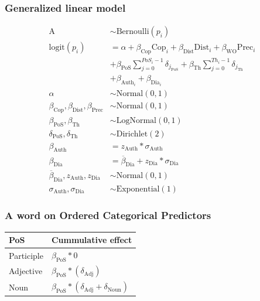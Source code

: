 \documentclass[10pt]{beamer}
\begin{document}
\begin{frame}
	\frametitle{Generalized linear model}
	\small
	\begin{align*}
		\text{A} &\sim \text{Bernoulli}(p_i)\\
		\text{logit}(p_i) &= \alpha + 
		\beta_{\text{Cop}}\text{Cop}_i + 
		\beta_{\text{Dist}}\text{Dist}_i + \beta_{\text{WO}} \text{Prec}_i \\&+
		\beta_{\text{PoS}}\sum^{PoS_{i}-1}_{j=0}{\delta_{j_{\text{PoS}}}} + \beta_{\text{Th}}\sum^{Th_{i}-1}_{j=0}{\delta_{j_{\text{Th}}}} \\&+
			\beta_{\text{Auth}_{i}} + \beta_{\text{Dia}_i}\\
		\alpha &\sim \text{Normal}(0, 1)\\
		\beta_{\text{Cop}}, \beta_{\text{Dist}}, \beta_{\text{Prec}} &\sim \text{Normal}(0, 1)\\
		\beta_{\text{PoS}}, \beta_{\text{Th}} &\sim \text{LogNormal}(0, 1)\\
		\delta_{\text{PoS}}, \delta_{\text{Th}} &\sim \text{Dirichlet}(2)\\
		\beta_{\text{Auth}} &= z_{\text{Auth}}*\sigma_{\text{Auth}}\\
		\beta_{\text{Dia}} &= \overline{\beta}_\text{Dia} + z_{\text{Dia}}*\sigma_{\text{Dia}}\\
		\overline{\beta}_\text{Dia}, z_{\text{Auth}}, z_{\text{Dia}} &\sim \text{Normal}(0,1)\\
		\sigma_{\text{Auth}}, \sigma_{\text{Dia}} &\sim \text{Exponential}(1)
	\end{align*}
\end{frame}

\begin{frame}
	\frametitle{A word on Ordered Categorical Predictors}

	\begin{center}
	\begin{tabular}[t]{ll}
	\toprule
	PoS & Cummulative effect\\
	\midrule
	Participle & $\beta_{\text{PoS}} * 0$\\
	Adjective & $\beta_{\text{PoS}} * (\delta_{\text{Adj}})$\\
	Noun & $\beta_{\text{PoS}} * (\delta_{\text{Adj}} + \delta_{\text{Noun}})$\\
	\bottomrule
	\end{tabular}
	\end{center}

\end{frame}
\end{document}
